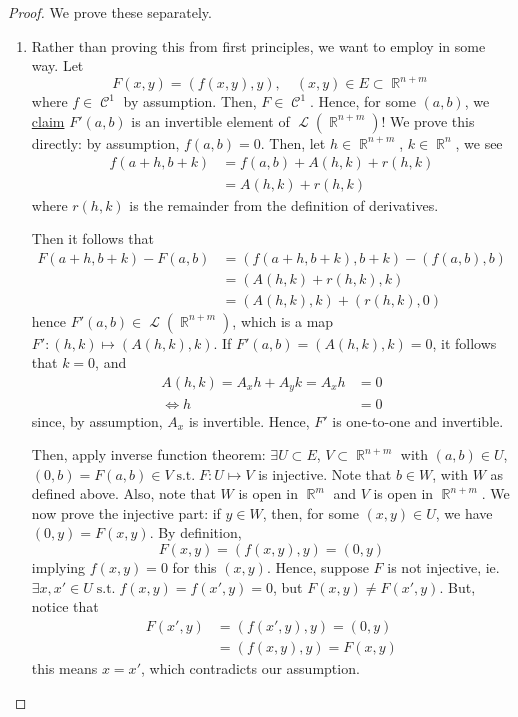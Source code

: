 \documentclass{amsart} %
\theoremstyle{mytheoremstyle}
\theoremstyle{definition}
\numberwithin{equation}{section}
\DeclareMathOperator{\R}{\mathbb{R}}
\DeclareMathOperator{\1}{\mathbbm{1}}
\DeclareMathOperator{\suchthat}{\text{ s.t. }}
\DeclareMathOperator{\contf}{\mathcal{C}}
\DeclareMathOperator{\linearop}{\mathcal{L}}
\begin{document}
\begin{proof}
	We prove these separately.
	
	\begin{enumerate}[label=(\arabic*)]
		\item 	Rather than proving this from first principles, we want to employ  in some way. Let
		$$F(x,y) = (f(x,y),y) , \quad (x,y) \in E \subset \R^{n+m}$$
		where $f \in \contf^1$ by assumption. Then, $F \in \contf^1$. Hence, for some $(a,b)$, we \uline{claim} $F'(a,b) $ is an invertible element of $\linearop (\R^{n+m})$! We prove this directly: by assumption, $f(a,b) =0$. Then, let $h \in \R^{n+m}$, $k \in \R^n$, we see
		\begin{align*}
		f(a+h,b+k) &= f(a,b) + A (h,k) + r(h,k) \\
		&= A (h,k) + r(h,k)
		\end{align*}
		where $r(h,k) $ is the remainder from the definition of derivatives.
		
		Then it follows that
		\begin{align*}
		F(a+h,b+k) - F(a,b) &= (f(a+h,b+k), b+k) - (f(a,b), b) \\
		&= ( A (h,k) + r(h,k), k ) \\
		&=(A(h,k), k) + (r(h,k),0)
		\end{align*}
		hence $F' (a,b) \in \linearop (\R^{n+m})$, which is a map $F' : (h,k) \mapsto (A(h,k),k)$. If $F'(a,b) = (A(h,k),k) = 0$, it follows that $k=0$, and 
		\begin{align*}
		A(h,k) = A_x h+ A_y k = A_x h &= 0 \\
		\iff h&=0 
		\end{align*}
		since, by assumption, $A_x$ is invertible. Hence, $F'$ is one-to-one and invertible.
		
		Then, apply inverse function theorem: $\exists U \subset E$, $V \subset \R^{n+m}$ with $(a,b) \in U$, $(0,b) = F(a,b) \in V \suchthat F:U \mapsto V $ is injective. Note that $b \in W$, with $W$ as defined above. Also, note that $W$ is open in $\R^m$ and $V $ is open in $\R^{n+m}$. We now prove the injective part: if $y \in W$, then, for some $(x,y) \in U$, we have $(0,y) = F(x,y)$. By definition,
		$$F(x,y) = (f(x,y),y) = (0,y)$$
		implying $f(x,y)=0$ for this $(x,y)$. Hence, suppose $F$ is not injective, ie. $\exists x, x' \in U \suchthat f(x,y)=f(x',y)=0$, but $F(x,y) \neq F(x',y)$. But, notice that 
		\begin{align*}
		F(x',y) &= (f(x',y) , y) = (0,y) \\
		&= (f(x,y), y) = F(x,y)
		\end{align*}
		this means $x=x'$, which contradicts our assumption.
		

\end{enumerate}
\end{proof}
\end{document}
